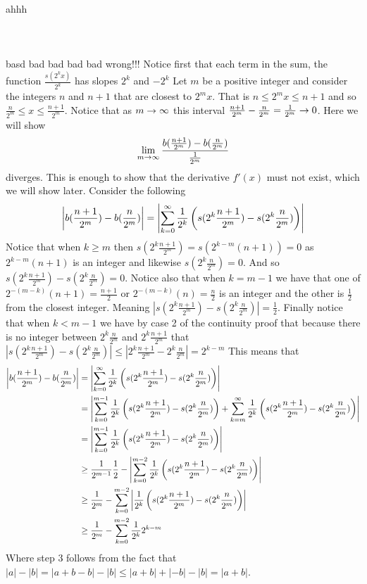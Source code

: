 \documentclass[12pt]{amsart}
\begin{document}
\begin{itemize}
      ahhh\\\\\\\\basd bad bad bad bad wrong!!!
      Notice first that each term in the sum, the function $\frac{s(2^kx)}{2^k}$ has slopes $2^k$ and $-2^k$
      Let $m$ be a positive integer and consider the integers $n$ and $n+1$ that are closest to $2^mx$. 
      That is $n\leq 2^mx\leq n+1$ and so $\frac{n}{2^m}\leq x\leq \frac{n+1}{2^m}$. Notice that as 
      $m\rightarrow \infty$ this interval $\frac{n+1}{2^m}-\frac{n}{2^m}=\frac{1}{2^m}\rightarrow 0$. Here we will show 
      \[\lim_{m\rightarrow\infty}\frac{b(\frac{n+1}{2^m})-b(\frac{n}{2^m})}{\frac{1}{2^m}}\] diverges. 
      This is enough to show that the derivative $f'(x)$ must not exist, which we will show later.
      Consider the following 
      \[\left\vert b(\frac{n+1}{2^m})-b(\frac{n}{2^m}) \right\vert=\left\vert \sum_{k=0}^\infty\frac{1}{2^k}\left(s(2^k\frac{n+1}{2^m})-s(2^k\frac{n}{2^m})\right) \right\vert\]
      Notice that when $k\geq m$ then $s(2^k\frac{n+1}{2^m})=s(2^{k-m}(n+1))=0$ as $2^{k-m}(n+1)$ is an integer and likewise $s(2^k\frac{n}{2^m})=0$.
      And so $s(2^k\frac{n+1}{2^m})-s(2^k\frac{n}{2^m})=0$. Notice also that when $k=m-1$ we have that one of $2^{-(m-k)}(n+1)=\frac{n+1}{2}$ or $2^{-(m-k)}(n)=\frac{n}{2}$ 
      is an integer and the other is $\frac{1}{2}$ from the closest integer. Meaning $|s(2^k\frac{n+1}{2^m})-s(2^k\frac{n}{2^m})|= \frac{1}{2}$. 
      Finally notice that when $k<m-1$ we have by case 2 of the continuity proof that because there is no integer between $2^k\frac{n}{2^m}$ and 
      $2^k\frac{n+1}{2^m}$ that $|s(2^k\frac{n+1}{2^m})-s(2^k\frac{n}{2^m})|\leq |2^k\frac{n+1}{2^m}-2^k\frac{n}{2^m}|=2^{k-m}$ This means that
      \begin{align*}
         \left\vert b(\frac{n+1}{2^m})-b(\frac{n}{2^m}) \right\vert&=\left\vert \sum_{k=0}^\infty\frac{1}{2^k}\left(s(2^k\frac{n+1}{2^m})-s(2^k\frac{n}{2^m})\right) \right\vert\\
         &= \left\vert \sum_{k=0}^{m-1}\frac{1}{2^k}\left(s(2^k\frac{n+1}{2^m})-s(2^k\frac{n}{2^m})\right)+\sum_{k=m}^{\infty}\frac{1}{2^k}\left(s(2^k\frac{n+1}{2^m})-s(2^k\frac{n}{2^m})\right) \right\vert\\
         &= \left\vert \sum_{k=0}^{m-1}\frac{1}{2^k}\left(s(2^k\frac{n+1}{2^m})-s(2^k\frac{n}{2^m})\right) \right\vert\\
         &\geq \frac{1}{2^{m-1}}\frac{1}{2}-\left\vert \sum_{k=0}^{m-2}\frac{1}{2^k}\left(s(2^k\frac{n+1}{2^m})-s(2^k\frac{n}{2^m})\right) \right\vert\\
         &\geq \frac{1}{2^m}-\sum_{k=0}^{m-2}\left\vert \frac{1}{2^k}\left(s(2^k\frac{n+1}{2^m})-s(2^k\frac{n}{2^m})\right) \right\vert\\
         &\geq \frac{1}{2^m}-\sum_{k=0}^{m-2}\frac{1}{2^k}2^{k-m}
      \end{align*}
      Where step 3 follows from the fact that $|a|-|b|=|a+b-b|-|b|\leq |a+b|+|-b|-|b|=|a+b|$.




\end{itemize}
\end{document}
